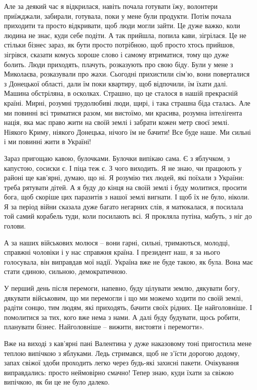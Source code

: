 Але за деякий час я відкрилася, навіть почала готувати їжу, волонтери
приїжджали, забирали, готувала, поки у мене були продукти. Потім почала
приходити та просто відкривати, щоб люди могли зайти. Це дуже важко,
коли людина не знає, куди себе подіти. А так прийшла, попила кави,
зігрілася. Це не стільки бізнес зараз, як бути просто потрібною, щоб
просто хтось прийшов, зігрівся, сказати комусь хороше слово і самому
втриматися, тому що дуже болить. Люди приходять, плачуть, розказують про
свою біду. Були у мене з Миколаєва, розказували про жахи. Сьогодні
прихистили сім'ю, вони поверталися з Донецької області, дали їм поки
квартиру, щоб відпочили, їм їхати далі. Машина обстріляна, в осколках.
Страшно, що це сталося в нашій прекрасній країні. Мирні, розумні
трудолюбиві люди, щирі, і така страшна біда сталась. Але ми повинні всі
триматися разом, ми вистоїмо, ми красива, розумна інтелігента нація, яка
має право жити на своїй землі і забрати кожен метр своєї землі. Ніякого
Криму, ніякого Донецька, нічого їм не бачити! Все буде наше. Ми сильні і
ми повинні жити в Україні!

Зараз пригощаю кавою, булочками. Булочки випікаю сама. Є з яблучком, з
капустою, сосиски є. І піца теж є. З чого виходить. Я не знаю, чи
працюють у районі ще кав'ярні, думаю, що ні. Я розумію тих людей, які
поїхали з України: треба рятувати дітей. А я буду до кінця на своїй землі
і буду молитися, просити бога, щоб скоріше цих паразитів з нашої землі
вигнати. І щоб їх не було, ніколи. Я за період війни сказала дуже багато
негарних слів, я матюкалася, я посилала той самий корабель туди, коли
посилають всі. Я прокляла путіна, мабуть, з ніг до голови. 

А за наших військових молюся – вони гарні, сильні, тримаються, молодці,
справжні чоловіки і у нас справжня країна. І президент наш, я за нього
голосувала, він виправдав мої надії. Україна вже не буде такою, як була.
Вона має стати єдиною, сильною, демократичною.

У перший день після перемоги, напевно, буду цілувати землю, дякувати
богу, дякувати військовим, що ми перемогли і що ми можемо ходити по
своїй землі, радіти сонцю, тим людям, які приходять, бачити своїх
рідних. Це найголовніше. І помолитися за тих, кого вже нема з нами. А
далі буду будувати, щось робити, планувати бізнес. Найголовніше –
вижити, вистояти і перемогти».

Вже на виході з кав'ярні пані Валентина у дуже наказовому тоні
пригостила мене теплою випічкою з яблуками. Ледь стримався, щоб не
з'їсти дорогою додому, запах свіжої здоби проходить легко через будь-які
захисні пакети. Очікування виправдались: просто неймовірно смачно! Тепер
знаю, куди їхати за свіжою випічкою, як би це не було далеко.

